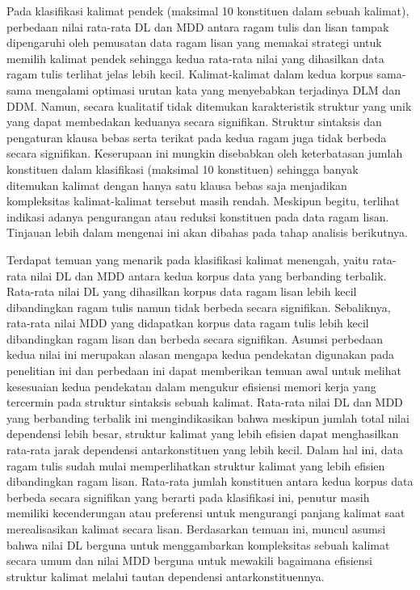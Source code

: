 Pada klasifikasi kalimat pendek (maksimal 10 konstituen dalam sebuah kalimat), perbedaan nilai rata-rata DL dan MDD antara ragam tulis dan lisan tampak dipengaruhi oleh pemusatan data ragam lisan yang memakai strategi untuk memilih kalimat pendek sehingga kedua rata-rata nilai yang dihasilkan data ragam tulis terlihat jelas lebih kecil. Kalimat-kalimat dalam kedua korpus sama-sama mengalami optimasi urutan kata yang menyebabkan terjadinya DLM dan DDM. Namun, secara kualitatif tidak ditemukan karakteristik struktur yang unik yang dapat membedakan keduanya secara signifikan. Struktur sintaksis dan pengaturan klausa bebas serta terikat pada kedua ragam juga tidak berbeda secara signifikan. Keserupaan ini mungkin disebabkan oleh keterbatasan jumlah konstituen dalam klasifikasi (maksimal 10 konstituen) sehingga banyak ditemukan kalimat dengan hanya satu klausa bebas saja menjadikan kompleksitas kalimat-kalimat tersebut masih rendah. Meskipun begitu, terlihat indikasi adanya pengurangan atau reduksi konstituen pada data ragam lisan. Tinjauan lebih dalam mengenai ini akan dibahas pada tahap analisis berikutnya.

Terdapat temuan yang menarik pada klasifikasi kalimat menengah, yaitu rata-rata nilai DL dan MDD antara kedua korpus data yang berbanding terbalik. Rata-rata nilai DL yang dihasilkan korpus data ragam lisan lebih kecil dibandingkan ragam tulis namun tidak berbeda secara signifikan. Sebaliknya, rata-rata nilai MDD yang didapatkan korpus data ragam tulis lebih kecil dibandingkan ragam lisan dan berbeda secara signifikan. Asumsi perbedaan kedua nilai ini merupakan alasan mengapa kedua pendekatan digunakan pada penelitian ini dan perbedaan ini dapat memberikan temuan awal untuk melihat kesesuaian kedua pendekatan dalam mengukur efisiensi memori kerja yang tercermin pada struktur sintaksis sebuah kalimat. Rata-rata nilai DL dan MDD yang berbanding terbalik ini mengindikasikan bahwa meskipun jumlah total nilai dependensi lebih besar, struktur kalimat yang lebih efisien dapat menghasilkan rata-rata jarak dependensi antarkonstituen yang lebih kecil. Dalam hal ini, data ragam tulis sudah mulai memperlihatkan struktur kalimat yang lebih efisien dibandingkan ragam lisan. Rata-rata jumlah konstituen antara kedua korpus data berbeda secara signifikan yang berarti pada klasifikasi ini, penutur masih memiliki kecenderungan atau preferensi untuk mengurangi panjang kalimat saat merealisasikan kalimat secara lisan. Berdasarkan temuan ini, muncul asumsi bahwa nilai DL berguna untuk menggambarkan kompleksitas sebuah kalimat secara umum dan nilai MDD berguna untuk mewakili bagaimana efisiensi struktur kalimat melalui tautan dependensi antarkonstituennya.

